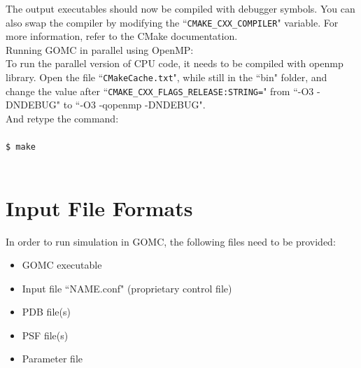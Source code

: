 The output executables should now be compiled with debugger symbols.
You can also swap the compiler by modifying the ``\texttt{CMAKE\_CXX\_COMPILER}" variable. For more information, refer to the CMake documentation.\\
Running GOMC in parallel using OpenMP:\\
To run the parallel version of CPU code, it needs to be compiled with openmp library. Open the file ``\texttt{CMakeCache.txt}", while still in the ``bin" folder, and change the value after ``\texttt{CMAKE\_CXX\_FLAGS\_RELEASE:STRING=}" from ``-O3 -DNDEBUG" to ``-O3 -qopenmp -DNDEBUG".\\
And retype the command:\\\\
\texttt{\$ make}\\\\
\section{Input File Formats}
In order to run simulation in GOMC, the following files need to be provided:
\begin{itemize}
\item GOMC executable
\item Input file ``NAME.conf" (proprietary control file)
\item PDB file(s)
\item PSF file(s)
\item Parameter file
\end{itemize}
